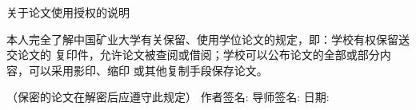 \vspace{0.8cm}

\begin{center}

\heiti{}关于论文使用授权的说明
\end{center}
\par
本人完全了解中国矿业大学有关保留、使用学位论文的规定，即：学校有权保留送交论文的
复印件，允许论文被查阅或借阅；学校可以公布论文的全部或部分内容，可以采用影印、缩印
或其他复制手段保存论文。
\par
（保密的论文在解密后应遵守此规定） \vskip 12mm
\hspace{20mm}作者签名:\underline{\makebox[0.15\textwidth][c]{}}
导师签名:\underline{\makebox[0.15\textwidth][c]{}}
日期:\underline{\makebox[0.15\textwidth][c]{}} \vskip3mm
\pagebreak
\newpage 
\thispagestyle{empty}
\mbox{} 
\newpage

